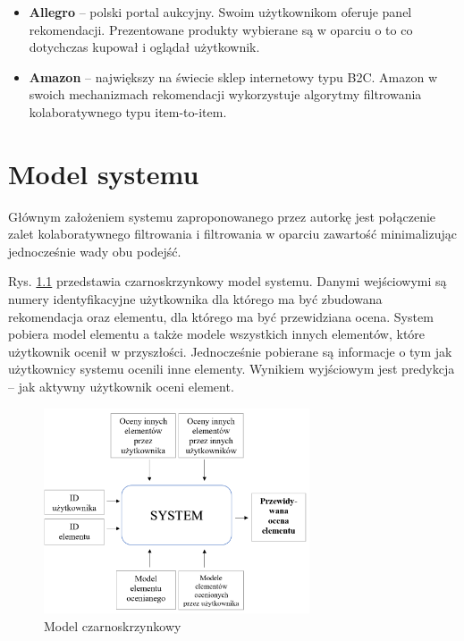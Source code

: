 \documentclass[twoside]{iisthesis}
\begin{document}
		\begin{itemize}
			 \item \textbf{Allegro} -- polski portal aukcyjny. Swoim użytkownikom oferuje panel rekomendacji. Prezentowane produkty wybierane są w oparciu o to co dotychczas kupował i oglądał użytkownik\cite{id:allegrofaq}. 
			 \item \textbf{Amazon} -- największy na świecie sklep internetowy typu B2C. Amazon w swoich mechanizmach rekomendacji wykorzystuje algorytmy filtrowania kolaboratywnego typu item-to-item\cite{id:linden2003amazon}.
		 \end{itemize}	 
	  
 
 \chapter{Model systemu}
 
 Głównym założeniem systemu zaproponowanego przez autorkę jest połączenie zalet kolaboratywnego filtrowania i filtrowania w oparciu zawartość minimalizując jednocześnie wady obu podejść. 
 
 Rys. \ref{fig:blackbox} przedstawia czarnoskrzynkowy model systemu. Danymi wejściowymi są numery identyfikacyjne użytkownika dla którego ma być zbudowana rekomendacja oraz elementu, dla którego ma być przewidziana ocena. System pobiera model elementu a także modele wszystkich innych elementów, które użytkownik ocenił w przyszłości. Jednocześnie pobierane są informacje o tym jak użytkownicy systemu ocenili inne elementy. Wynikiem wyjściowym jest predykcja -- jak aktywny użytkownik oceni element.
 
 \begin{figure}[!ht] 
   	\centering
   	\includegraphics[width=0.7\textwidth]{blackbox}
   	\caption{Model czarnoskrzynkowy}
   	\label{fig:blackbox}
 \end{figure}
 
\end{document}
